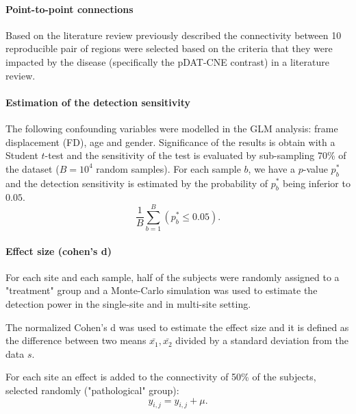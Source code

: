 \documentclass[authoryear]{elsarticle}
\begin{document}
\paragraph{Point-to-point connections}
Based on the literature review previously described the connectivity between 10 reproducible pair of regions were selected based on the criteria that they were impacted by the disease (specifically the pDAT-CNE contrast) in a literature review.

\paragraph{Estimation of the detection sensitivity}
The following confounding variables were modelled in the GLM analysis: frame displacement (FD), age and gender. Significance of the results is obtain with a Student $t$-test and the sensitivity of the test is evaluated by sub-sampling 70\% of the dataset ($B=10^4$ random samples). For each sample $b$, we have a $p$-value $p^{*}_b$ and the detection sensitivity is estimated by the probability of $p^{*}_b$ being inferior to $0.05$.
\begin{equation}\label{Detection power}  
    \frac{1}{B}\sum\limits_{b=1}^B\left(p^{*}_b\leq0.05\right).
\end{equation}


\paragraph{Effect size (cohen's d)}
For each site and each sample, half of the subjects were randomly assigned to a "treatment" group and a Monte-Carlo simulation was used to estimate the detection power in the single-site and in multi-site setting.

The normalized Cohen's d was used to estimate the effect size and it is defined as the difference between two means $\bar{x_{1}},\bar{x_{2}}$ divided by a standard deviation from the data $s$.

For each site an effect is added to the connectivity of 50\% of the subjects, selected randomly ("pathological" group):
\begin{equation}
	y_{i,j} = y_{i,j} + \mu.
\end{equation}
\end{document}
